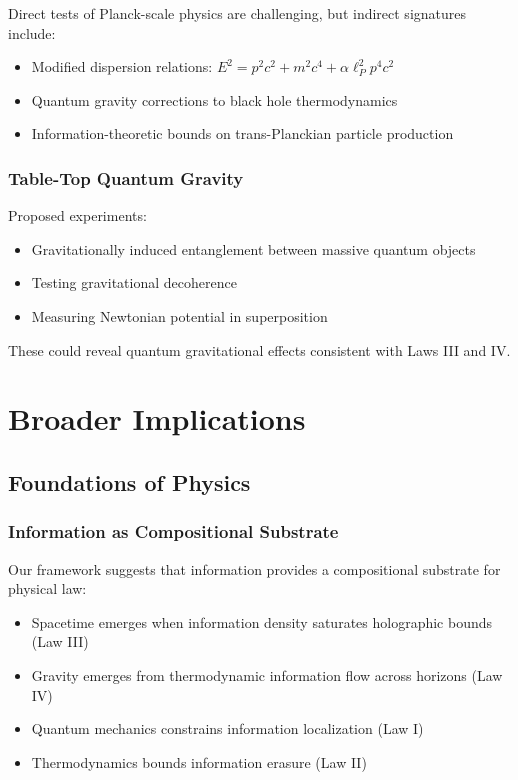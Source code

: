 \documentclass[11pt,a4paper]{article}
\theoremstyle{plain}
\theoremstyle{definition}
\theoremstyle{remark}
\begin{document}
Direct tests of Planck-scale physics are challenging, but indirect signatures include:

\begin{itemize}[leftmargin=*]
\item Modified dispersion relations: $E^2 = p^2c^2 + m^2c^4 + \alpha\ell_P^2 p^4c^2$
\item Quantum gravity corrections to black hole thermodynamics
\item Information-theoretic bounds on trans-Planckian particle production
\end{itemize}

\subsubsection{Table-Top Quantum Gravity}

Proposed experiments:
\begin{itemize}[leftmargin=*]
\item Gravitationally induced entanglement between massive quantum objects
\item Testing gravitational decoherence
\item Measuring Newtonian potential in superposition
\end{itemize}

These could reveal quantum gravitational effects consistent with Laws III and IV.

\section{Broader Implications}
\label{sec:implications}

\subsection{Foundations of Physics}

\subsubsection{Information as Compositional Substrate}

Our framework suggests that information provides a compositional substrate for physical law:

\begin{itemize}[leftmargin=*]
\item Spacetime emerges when information density saturates holographic bounds (Law III)
\item Gravity emerges from thermodynamic information flow across horizons (Law IV)
\item Quantum mechanics constrains information localization (Law I)
\item Thermodynamics bounds information erasure (Law II)
\end{itemize}
\end{document}
